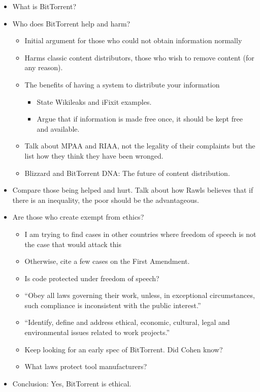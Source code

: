 \documentclass[11pt]{article}
\begin{document}
\begin{itemize}
\item What is BitTorrent?
\item Who does BitTorrent help and harm?
\begin{itemize}
   \item Initial argument for those who could not obtain information normally
   \item Harms classic content distributors, those who wish to remove content (for any reason).
   \item The benefits of having a system to distribute your information
   \begin{itemize}
      \item State Wikileaks and iFixit examples.
      \item Argue that if information is made free once, it should be kept free and available.
   \end{itemize}
   \item Talk about MPAA and RIAA, not the legality of their complaints but the list how they think they have been wronged.
   \item Blizzard and BitTorrent DNA: The future of content distribution.
\end{itemize}

\item Compare those being helped and hurt. Talk about how Rawls believes that if there is an inequality, the poor should be the advantageous.

\item Are those who create exempt from ethics?
\begin{itemize}
   \item I am trying to find cases in other countries where freedom of speech is not the case that would attack this
   \item Otherwise, cite a few cases on the First Amendment. 
   \item Is code protected under freedom of speech?
   \item ``Obey all laws governing their work, unless, in exceptional circumstances, such compliance is inconsistent with the public interest.'' \cite[6.06]{secode}
   \item ``Identify, define and address ethical, economic, cultural, legal and environmental issues related to work projects.'' \cite[3.03]{secode}
   \item Keep looking for an early spec of BitTorrent. Did Cohen know?
   \item What laws protect tool manufacturers?
\end{itemize}

\item Conclusion: Yes, BitTorrent is ethical.
\end{itemize}


\end{document}
